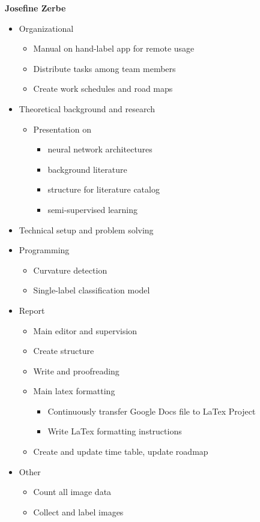\bigskip
\textbf{Josefine Zerbe}
\begin{itemize}
	\item Organizational
	\begin{itemize}
		\item Manual on hand-label app for remote usage
		\item Distribute tasks among team members
		\item Create work schedules and road maps
	\end{itemize}
	\item Theoretical background and research
	\begin{itemize}
		\item Presentation on
		\begin{itemize}
			\item neural network architectures
			\item background literature
			\item structure for literature catalog
			\item semi-supervised learning
		\end{itemize}
	\end{itemize}
	\item Technical setup and problem solving
	\item Programming
	\begin{itemize}
		\item Curvature detection
		\item Single-label classification model
	\end{itemize}
	\item Report
	\begin{itemize}
		\item Main editor and supervision
		\item Create structure
		\item Write and proofreading
		\item Main latex formatting
		\begin{itemize}
			\item Continuously transfer Google Docs file to LaTex Project
			\item Write LaTex formatting instructions
		\end{itemize}
		\item Create and update time table, update roadmap
	\end{itemize}
	\item Other
	\begin{itemize}
		\item Count all image data
		\item Collect and label images
	\end{itemize}
\end{itemize}



